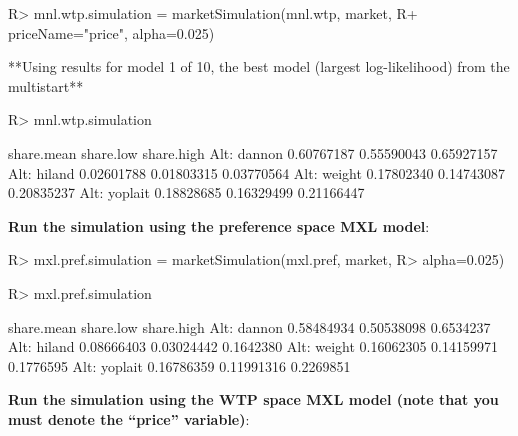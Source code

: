 \documentclass[article]{jss}
\begin{document}
\begin{CodeChunk}

\begin{CodeInput}
R> mnl.wtp.simulation = marketSimulation(mnl.wtp, market,
R+                                       priceName="price", alpha=0.025)
\end{CodeInput}

\begin{CodeOutput}
**Using results for model 1 of 10,
the best model (largest log-likelihood) from the multistart**
\end{CodeOutput}

\begin{CodeInput}
R> mnl.wtp.simulation
\end{CodeInput}

\begin{CodeOutput}
             share.mean  share.low share.high
Alt: dannon  0.60767187 0.55590043 0.65927157
Alt: hiland  0.02601788 0.01803315 0.03770564
Alt: weight  0.17802340 0.14743087 0.20835237
Alt: yoplait 0.18828685 0.16329499 0.21166447
\end{CodeOutput}
\end{CodeChunk}

\textbf{Run the simulation using the preference space MXL model}:

\begin{CodeChunk}

\begin{CodeInput}
R> mxl.pref.simulation = marketSimulation(mxl.pref, market, 
R>                                        alpha=0.025)
\end{CodeInput}
\end{CodeChunk}

\begin{CodeChunk}

\begin{CodeInput}
R> mxl.pref.simulation
\end{CodeInput}

\begin{CodeOutput}
             share.mean  share.low share.high
Alt: dannon  0.58484934 0.50538098  0.6534237
Alt: hiland  0.08666403 0.03024442  0.1642380
Alt: weight  0.16062305 0.14159971  0.1776595
Alt: yoplait 0.16786359 0.11991316  0.2269851
\end{CodeOutput}
\end{CodeChunk}

\textbf{Run the simulation using the WTP space MXL model (note that you
must denote the ``price'' variable)}:
\end{document}
